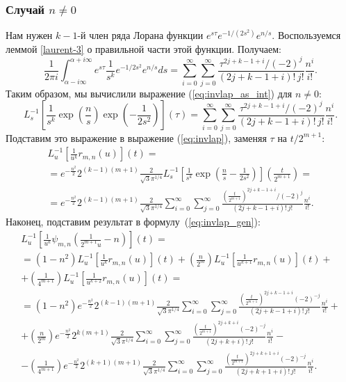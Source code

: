 \documentclass[../paper.tex]{subfiles}
\begin{document}
\subsubsection{Случай $n \neq 0$}
Нам нужен $k-1$-й член ряда Лорана функции $e^{s\tau} e^{-1/(2s^2)} e^{n/s}$. Воспользуемся леммой \ref{laurent-3} о правильной части этой функции. Получаем:
\[
    \frac{1}{2\pi i}\int_{\alpha-i\infty}^{\alpha+i\infty} e^{s\tau} \frac{1}{s^k} e^{-1/{2s^2}} e^{n/s} ds =
    \sum_{i=0}^{\infty} \sum_{j=0}^{\infty} \frac{\tau^{2j+k-1+i} / (-2)^j}{(2j+k-1+i)!\,j!} \frac{n^i}{i!}
.\]
Таким образом, мы вычислили выражение (\ref{eq:invlap_as_int}) для $n \ne 0$:
\[
    L^{-1}_s \left[ \frac{1}{s^k}
    \exp \left(\frac{n}{s}\right)
    \exp \left(-\frac{1}{2 s^2 }\right)
    \right] \left( \tau \right)
=
    \sum_{i=0}^{\infty} \sum_{j=0}^{\infty} \frac{\tau^{2j+k-1+i} / (-2)^j}{(2j+k-1+i)!\,j!} \frac{n^i}{i!}
.\]
Подставим это выражение в выражение (\ref{eq:invlap}), заменяя $\tau$ на $t/2^{m+1}$:
\begin{multline*}
    L^{-1}_u \left[ \frac{1}{u^k} r_{m,n}(u) \right](t)
=\\=%
    e^{-\frac{n^2}{2}} 2^{(k-1)(m+1)} \frac{2}{\sqrt{3} \pi^{1/4}}
    L^{-1}_s \left[ \frac{1}{s^k}
    \exp \left(\frac{n}{s} - \frac{1}{2 s^2 }
    \right)
    \right] \left( \frac{t}{2^{m+1}} \right)
=\\=%
    e^{-\frac{n^2}{2}} 2^{(k-1)(m+1)} \frac{2}{\sqrt{3} \pi^{1/4}}
    \sum_{i=0}^{\infty} \sum_{j=0}^{\infty} \frac{\left( \frac{t}{2^{m+1}} \right) ^{2j+k-1+i} / (-2)^j}{(2j+k-1+i)!\,j!} \frac{n^i}{i!}
.\end{multline*}
Наконец, подставим результат в формулу~(\ref{eq:invlap_gen}):
\begin{multline}\label{local:not0:gmn}
    L^{-1}_u \left[ \frac{1}{u^k} \psi_{m,n} \left( \frac{1}{2^{m+1} u} - n \right) \right] (t) 
=\\=
    \left( 1 - n^2 \right)  L^{-1}_u \left[ \frac{1}{u^k} r_{m,n}(u) \right](t) +
    \left( \frac{n}{2^m} \right)  L^{-1}_u \left[ \frac{1}{u^{k+1}} r_{m,n}(u) \right](t)
+\\+
    \left( \frac{1}{4^{m+1}} \right)  L^{-1}_u \left[ \frac{1}{u^{k+2}} r_{m,n}(u) \right](t)
=\\=
    \left( 1-n^2 \right) 
    e^{-\frac{n^2}{2}} 2^{(k-1)(m+1)} \frac{2}{\sqrt{3} \pi^{1/4}}
    \sum_{i=0}^{\infty} \sum_{j=0}^{\infty} \frac{\left( \frac{t}{2^{m+1}} \right) ^{2j+k-1+i} (-2)^{-j}}{(2j+k-1+i)!\,j!} \frac{n^i}{i!}
+\\+
    \left( \frac{n}{2^m} \right) 
    e^{-\frac{n^2}{2}} 2^{k(m+1)} \frac{2}{\sqrt{3} \pi^{1/4}}
    \sum_{i=0}^{\infty} \sum_{j=0}^{\infty} \frac{\left( \frac{t}{2^{m+1}} \right) ^{2j+k+i} (-2)^{-j}}{(2j+k+i)!\,j!} \frac{n^i}{i!}
-\\-
    \left( \frac{1}{4^{m+1}} \right) 
    e^{-\frac{n^2}{2}} 2^{(k+1)(m+1)} \frac{2}{\sqrt{3} \pi^{1/4}}
    \sum_{i=0}^{\infty} \sum_{j=0}^{\infty} \frac{\left( \frac{t}{2^{m+1}} \right) ^{2j+k+1+i} (-2)^{-j}}{(2j+k+1+i)!\,j!} \frac{n^i}{i!}
.\end{multline}
\end{document}
